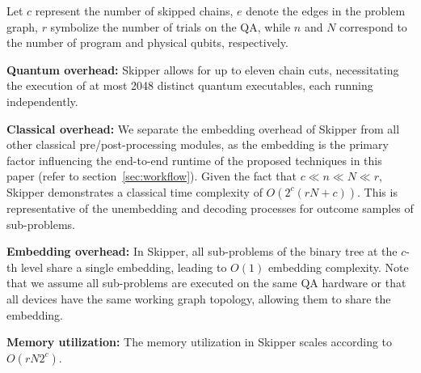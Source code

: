 Let ${c}$ represent the number of skipped chains, $e$ denote the edges in the problem graph, $r$ symbolize the number of trials on the QA, while $n$ and $N$ correspond to the number of program and physical qubits, respectively.

\vspace{0.05in}
\noindent \textbf{Quantum overhead:}
Skipper allows for up to eleven chain cuts, necessitating the execution of at most 2048 distinct quantum executables, each running independently.

\vspace{0.05in}
\noindent \textbf{Classical overhead:}
We separate the embedding overhead of Skipper from all other classical pre/post-processing modules, as the embedding is the primary factor influencing the end-to-end runtime of the proposed techniques in this paper (refer to section~\ref{sec:workflow}). 
Given the fact that $c \ll n \ll N \ll r$, Skipper demonstrates a classical time complexity of $O\left( 2^c \left(rN + c \right) \right)$. 
This is representative of the unembedding and decoding processes for outcome samples of sub-problems.

\vspace{0.05in}
\noindent \textbf{Embedding overhead:}
In Skipper, all sub-problems of the binary tree at the $c$-th level share a single embedding, leading to $O(1)$ embedding complexity. 
Note that we assume all sub-problems are executed on the same QA hardware or that all devices have the same working graph topology, allowing them to share the embedding.

\vspace{0.05in}
\noindent \textbf{Memory utilization:}
The memory utilization in Skipper scales according to $O(rN2^c)$.



